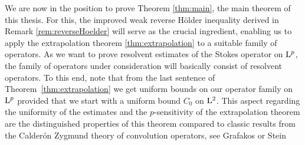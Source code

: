 We are now in the position to prove Theorem \ref{thm:main}, the main theorem of this thesis. 
For this, the improved weak reverse H\"older inequality derived in Remark \ref{rem:reverseHoelder} will serve as the crucial ingredient, enabling us to apply the extrapolation theorem \ref{thm:extrapolation} to a suitable family of operators.
As we want to prove resolvent estimates of the Stokes operator on $\mathrm{L}^p$, the family of operators under consideration will basically consist of resolvent operators.
To this end, note that from the last sentence of Theorem~\ref{thm:extrapolation} we get uniform bounds on our operator family on $\mathrm{L}^p$ provided that we start with a uniform bound $C_0$ on $\mathrm{L}^2$.
This aspect regarding the uniformity of the estimates and the $p$-sensitivity of the extrapolation theorem are the distinguished properties of this theorem compared to classic results from the Calder\'on Zygmund theory of convolution operators, see Grafakos \cite[Sec. 5.3]{grafakos2014classical} or Stein \cite[Ch. 2]{stein}


